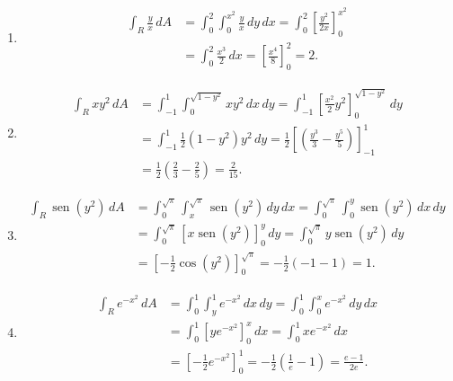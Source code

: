 \documentclass[
  spanish,
  a4paper,
]{scrreport}
\theoremstyle{definition}
\theoremstyle{remark}
\begin{document}
\begin{tcolorbox}[enhanced jigsaw, arc=.35mm, bottomrule=.15mm, bottomtitle=1mm, breakable, colback=white, colbacktitle=quarto-callout-tip-color!10!white, colframe=quarto-callout-tip-color-frame, coltitle=black, left=2mm, leftrule=.75mm, opacityback=0, opacitybacktitle=0.6, rightrule=.15mm, title=\textcolor{quarto-callout-tip-color}{\faLightbulb}\hspace{0.5em}{Solución}, titlerule=0mm, toprule=.15mm, toptitle=1mm]

\begin{enumerate}
\def\labelenumi{\alph{enumi}.}
\item
  \begin{align*}
  \int_R \frac{y}{x}\,dA 
  &= \int_0^2 \int_0^{x^2} \frac{y}{x}\,dy\,dx
  = \int_0^2 \left[\frac{y^2}{2x}\right]_0^{x^2} \\
  &= \int_0^2 \frac{x^3}{2}\,dx
  = \left[\frac{x^4}{8}\right]_0^2
  = 2.
  \end{align*}
\item
  \begin{align*}
  \int_R xy^2\,dA 
  &= \int_{-1}^1 \int_0^{\sqrt{1-y^2}} xy^2\,dx\,dy
  = \int_{-1}^1 \left[\frac{x^2}{2}y^2\right]_0^{\sqrt{1-y^2}} \,dy \\
  &= \int_{-1}^1 \frac{1}{2}(1-y^2)y^2\,dy 
  = \frac{1}{2}\left[\left(\frac{y^3}{3}-\frac{y^5}{5}\right)\right]_{-1}^1 \\
  &= \frac{1}{2}\left(\frac{2}{3}-\frac{2}{5}\right)
  = \frac{2}{15}.
  \end{align*}
\item
  \begin{align*}
  \int_R \operatorname{sen}(y^2)\,dA  
  &= \int_0^{\sqrt{\pi}} \int_x^{\sqrt{\pi}} \operatorname{sen}(y^2)\,dy\,dx 
  = \int_0^{\sqrt{\pi}}\int_0^y \operatorname{sen}(y^2)\,dx\,dy \\
  &= \int_0^{\sqrt{\pi}} [x\operatorname{sen}(y^2)]_0^y\,dy 
  = \int_0^{\sqrt{\pi}} y\operatorname{sen}(y^2)\,dy \\
  &= \left[-\frac{1}{2}\cos(y^2)\right]_0^{\sqrt{\pi}} 
  = -\frac{1}{2}(-1-1)
  = 1.
  \end{align*}
\item
  \begin{align*}
  \int_R e^{-x^2}\,dA  
  &= \int_0^1 \int_y^1 e^{-x^2}\,dx\,dy 
  = \int_0^1\int_0^x e^{-x^2}\,dy\,dx \\
  &= \int_0^1 [ye^{-x^2}]_0^x\,dx 
  = \int_0^1 xe^{-x^2}\,dx \\
  &= \left[-\frac{1}{2}e^{-x^2}\right]_0^1
  = -\frac{1}{2}\left(\frac{1}{e}-1\right)
  = \frac{e-1}{2e}.
  \end{align*}
\end{enumerate}

\end{tcolorbox}
\end{document}
